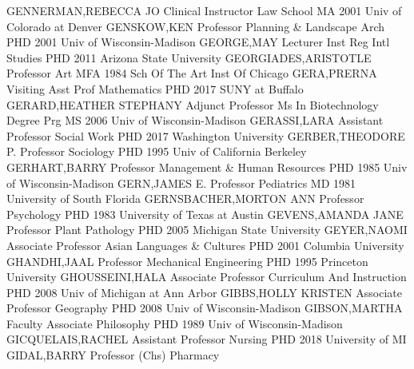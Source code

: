 \documentclass[
]{article}
\begin{document}
\textbar GENNERMAN,REBECCA JO \textbar Clinical Instructor \textbar Law
School \textbar{}  \textbar MA 2001 Univ of Colorado at
Denver \textbar GENSKOW,KEN \textbar Professor \textbar Planning \&
Landscape Arch \textbar{}  \textbar PHD 2001 Univ of
Wisconsin-Madison \textbar GEORGE,MAY \textbar Lecturer \textbar Inst
Reg Intl Studies \textbar{}  \textbar PHD 2011 Arizona State
University \textbar GEORGIADES,ARISTOTLE \textbar Professor \textbar Art
\textbar{}  \textbar MFA 1984 Sch Of The Art Inst Of Chicago
\textbar GERA,PRERNA \textbar Visiting Asst Prof \textbar Mathematics
\textbar{}  \textbar PHD 2017 SUNY at Buffalo
\textbar GERARD,HEATHER STEPHANY \textbar Adjunct Professor \textbar Ms
In Biotechnology Degree Prg \textbar{}  \textbar MS 2006
Univ of Wisconsin-Madison \textbar GERASSI,LARA \textbar Assistant
Professor \textbar Social Work \textbar{}  \textbar PHD 2017
Washington University \textbar GERBER,THEODORE P. \textbar Professor
\textbar Sociology \textbar{}  \textbar PHD 1995 Univ of
California Berkeley \textbar GERHART,BARRY \textbar Professor
\textbar Management \& Human Resources \textbar{} 
\textbar PHD 1985 Univ of Wisconsin-Madison \textbar GERN,JAMES E.
\textbar Professor \textbar Pediatrics \textbar{} 
\textbar MD 1981 University of South Florida \textbar GERNSBACHER,MORTON
ANN \textbar Professor \textbar Psychology \textbar{} 
\textbar PHD 1983 University of Texas at Austin \textbar GEVENS,AMANDA
JANE \textbar Professor \textbar Plant Pathology \textbar{} 
\textbar PHD 2005 Michigan State University \textbar GEYER,NAOMI
\textbar Associate Professor \textbar Asian Languages \& Cultures
\textbar{}  \textbar PHD 2001 Columbia University
\textbar GHANDHI,JAAL \textbar Professor \textbar Mechanical Engineering
\textbar{}  \textbar PHD 1995 Princeton University
\textbar GHOUSSEINI,HALA \textbar Associate Professor
\textbar Curriculum And Instruction \textbar{}  \textbar PHD
2008 Univ of Michigan at Ann Arbor \textbar GIBBS,HOLLY KRISTEN
\textbar Associate Professor \textbar Geography \textbar{} 
\textbar PHD 2008 Univ of Wisconsin-Madison \textbar GIBSON,MARTHA
\textbar Faculty Associate \textbar Philosophy \textbar{} 
\textbar PHD 1989 Univ of Wisconsin-Madison \textbar GICQUELAIS,RACHEL
\textbar Assistant Professor \textbar Nursing \textbar{} 
\textbar PHD 2018 University of MI \textbar GIDAL,BARRY
\textbar Professor (Chs) \textbar Pharmacy \textbar{} 
\end{document}
